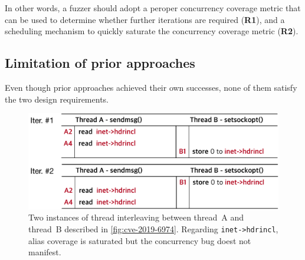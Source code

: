 In other words, a fuzzer should adopt a peroper concurrency coverage
metric that can be used to determine whether further iterations are
required (\textbf{R1}), and a scheduling mechanism to quickly saturate
the concurrency coverage metric (\textbf{R2}).



\subsection{Limitation of prior approaches}
\label{ss:existingapproaches}

Even though prior approaches achieved their own successes, none of
them satisfy the two design requirements.


\begin{figure}[t]
  \centering
  \includegraphics[width=0.95\linewidth]{fig/alias-coverage.pdf}
  \caption{Two instances of thread interleaving between thread~A and
    thread~B described in \autoref{fig:cve-2019-6974}. Regarding
    \texttt{inet->hdrincl}, alias coverage is saturated but the
    concurrency bug doest not manifest.}
  \label{fig:alias-coverage}
\end{figure}








